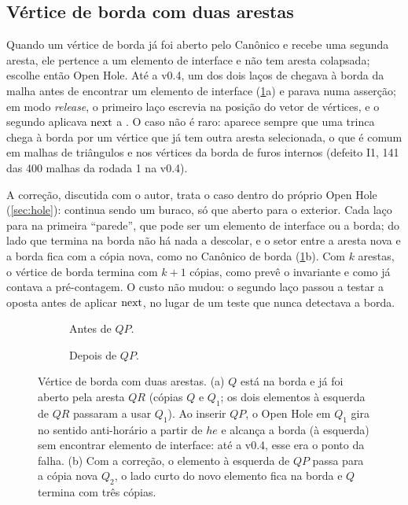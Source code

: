 \subsection{Vértice de borda com duas arestas}
\label{sec:falha-borda}

Quando um vértice de borda já foi aberto pelo Canônico e recebe uma segunda aresta, ele pertence a um elemento de
interface e não tem aresta colapsada;  escolhe então Open Hole. Até a v0.4, um dos dois laços de
 chegava à borda da malha antes de encontrar um elemento de interface (\cref{fig:borda}a) e parava numa
asserção; em modo \emph{release}, o primeiro laço escrevia na posição  do vetor de vértices, e o
segundo aplicava $\mathrm{next}$ a \BORDER. O caso não é raro: aparece sempre que uma trinca chega à borda por um vértice que já
tem outra aresta selecionada, o que é comum em malhas de triângulos e nos vértices da borda de furos internos (defeito
I1, 141 das 400 malhas da rodada 1 na v0.4).

A correção, discutida com o autor, trata o caso dentro do próprio Open Hole (\cref{sec:hole}): continua sendo um
buraco, só que aberto para o exterior. Cada laço para na primeira ``parede'', que pode ser um elemento de interface ou a
borda; do lado que termina na borda não há nada a descolar, e o setor entre a aresta nova e a borda fica com a cópia
nova, como no Canônico de borda (\cref{fig:borda}b). Com $k$ arestas, o vértice de borda termina com $k+1$ cópias,
como prevê o invariante e como já contava a pré-contagem. O custo não mudou: o segundo laço passou a testar a oposta
antes de aplicar $\mathrm{next}$, no lugar de um teste que nunca detectava a borda.

\begin{figure}[ht]
\centering
\begin{subfigure}[b]{0.48\linewidth}\centering\caption{Antes de $QP$.}\end{subfigure}\hfill
\begin{subfigure}[b]{0.48\linewidth}\centering\caption{Depois de $QP$.}\end{subfigure}
\caption{Vértice de borda com duas arestas. (a) $Q$ está na borda e já foi aberto pela aresta $QR$ (cópias $Q$ e $Q_1$;
os dois elementos à esquerda de $QR$ passaram a usar $Q_1$). Ao inserir $QP$, o Open Hole em $Q_1$ gira no sentido
anti-horário a partir de $he$ e alcança a borda (à esquerda) sem encontrar elemento de interface: até a v0.4, esse era o
ponto da falha. (b) Com a correção, o elemento à esquerda de $QP$ passa para a cópia nova $Q_2$, o lado curto do novo
elemento fica na borda e $Q$ termina com três cópias.}
\label{fig:borda}
\end{figure}
